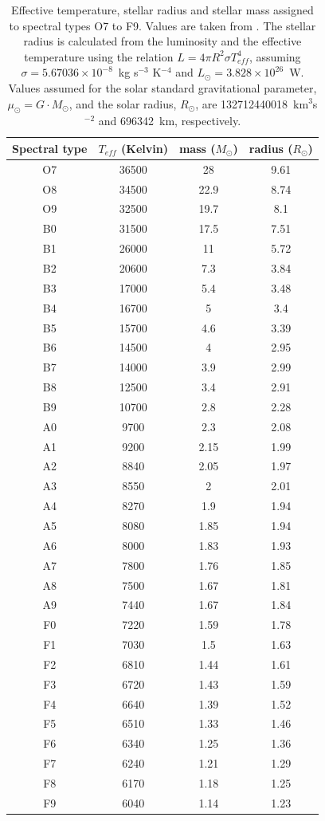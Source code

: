 \documentclass[11pt]{article}      %
\begin{document}
\begin{table}[hb]
  \begin{center}
  \caption{Effective temperature, stellar radius and stellar mass assigned to spectral types O7 to F9. Values are taken from \cite{stellarParameters}. The stellar radius is calculated from the luminosity and the effective temperature using the relation $L=4\pi R^2 \sigma T_{eff}^4$, assuming $\sigma=5.67036\times10^{-8}$~kg s$^{-3}$ K$^{-4}$ and $L_{\odot}=3.828\times10^{26}$~W. Values assumed for the solar standard gravitational parameter, $\mu_{\odot}=G\cdot M_{\odot}$,  and the solar radius, $R_{\odot}$, are 132712440018~km$^3$s$^{-2}$ and 696342~km, respectively.}
  \begin{tabular}{| c | c | c | c |}
    \hline 
    Spectral type & $T_{eff}$ (Kelvin) & mass ($M_{\odot}$) & radius ($R_{\odot}$)\\
    \hline
O7 & 36500 & 28 & 9.61 \\
O8 & 34500 & 22.9 & 8.74 \\
O9 & 32500 & 19.7 & 8.1 \\
B0 & 31500 & 17.5 & 7.51 \\
B1 & 26000 & 11 & 5.72 \\
B2 & 20600 & 7.3 & 3.84 \\
B3 & 17000 & 5.4 & 3.48 \\
B4 & 16700 & 5 & 3.4 \\
B5 & 15700 & 4.6 & 3.39 \\
B6 & 14500 & 4 & 2.95 \\
B7 & 14000 & 3.9 & 2.99 \\
B8 & 12500 & 3.4 & 2.91 \\
B9 & 10700 & 2.8 & 2.28 \\
A0 & 9700 & 2.3 & 2.08 \\
A1 & 9200 & 2.15 & 1.99 \\
A2 & 8840 & 2.05 & 1.97 \\
A3 & 8550 & 2 & 2.01 \\
A4 & 8270 & 1.9 & 1.94 \\
A5 & 8080 & 1.85 & 1.94 \\
A6 & 8000 & 1.83 & 1.93 \\
A7 & 7800 & 1.76 & 1.85 \\
A8 & 7500 & 1.67 & 1.81 \\
A9 & 7440 & 1.67 & 1.84 \\
F0 & 7220 & 1.59 & 1.78 \\
F1 & 7030 & 1.5 & 1.63 \\
F2 & 6810 & 1.44 & 1.61 \\
F3 & 6720 & 1.43 & 1.59 \\
F4 & 6640 & 1.39 & 1.52 \\
F5 & 6510 & 1.33 & 1.46 \\
F6 & 6340 & 1.25 & 1.36 \\
F7 & 6240 & 1.21 & 1.29 \\
F8 & 6170 & 1.18 & 1.25 \\
F9 & 6040 & 1.14 & 1.23 \\
    \hline
  \end{tabular}
  \label{tab:starProperties1}
  \end{center}
\end{table}
\end{document}
